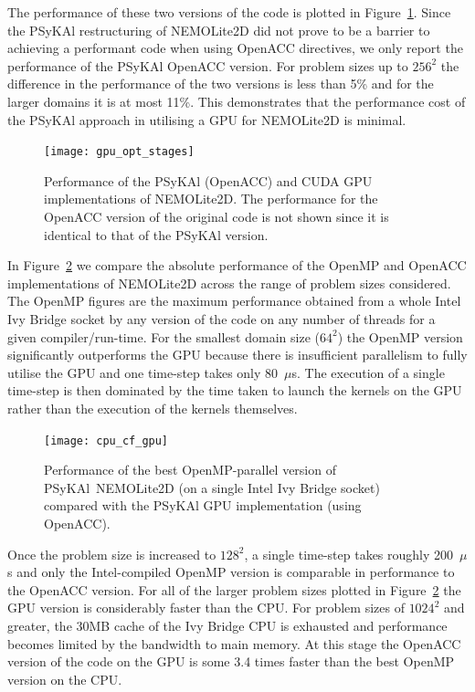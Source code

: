 \documentclass[gmd, manuscript]{copernicus}
\begin{document}
The performance of these two versions of the code is plotted in
Figure~\ref{FIG_gpu_opt_stages}.  Since the {PS}y{KA}l restructuring of
NEMOLite2D did not prove to be a barrier to achieving a performant
code when using OpenACC directives, we only report the performance of
the {PS}y{KA}l OpenACC version. For problem sizes up to $256^2$ the
difference in the performance of the two versions is less than 5\% and
for the larger domains it is at most 11\%. This demonstrates that the
performance cost of the {PS}y{KA}l approach in utilising a GPU for
NEMOLite2D is minimal.

\begin{figure}
\centering
\texttt{[image: gpu\_opt\_stages]}
\caption{Performance of the {PS}y{KA}l (OpenACC) and CUDA GPU
  implementations of NEMOLite2D. The performance for the OpenACC
  version of the original code is not shown since it is identical to
  that of the {PS}y{KA}l version.}
\label{FIG_gpu_opt_stages}
\end{figure}

In Figure~\ref{FIG_cpu_cf_gpu} we compare the absolute performance of
the OpenMP and OpenACC implementations of NEMOLite2D across the range
of problem sizes considered. The OpenMP figures are the maximum
performance obtained from a whole Intel Ivy Bridge socket by any
version of the code on any number of threads for a given
compiler/run-time. For the smallest domain size ($64^2$) the OpenMP
version significantly outperforms the GPU because there is
insufficient parallelism to fully utilise the GPU and one time-step
takes only 80~$\mu$s. The execution of a single time-step is then
dominated by the time taken to launch the kernels on the GPU rather than
the execution of the kernels themselves.

\begin{figure}
\centering
\texttt{[image: cpu\_cf\_gpu]}
\caption{Performance of the best OpenMP-parallel version of {PS}y{KA}l\
  NEMOLite2D (on a single Intel Ivy Bridge socket) compared with the {PS}y{KA}l GPU implementation (using OpenACC).}
\label{FIG_cpu_cf_gpu}
\end{figure}

Once the problem size is increased to $128^2$, a single time-step
takes roughly 200~$\mu$s and only the Intel-compiled OpenMP version is
comparable in performance to the OpenACC version. For all of the
larger problem sizes plotted in Figure~\ref{FIG_cpu_cf_gpu} the GPU
version is considerably faster than the CPU.  For problem sizes of
$1024^2$ and greater, the 30MB cache of the Ivy Bridge CPU is
exhausted and performance becomes limited by the bandwidth to main
memory. At this stage the OpenACC version of the code on the GPU is
some 3.4 times faster than the best OpenMP version on the CPU.
\end{document}
